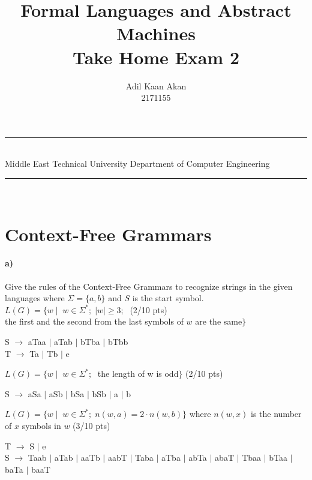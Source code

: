 \documentclass[a4paper,12pt]{article}
\title{Formal Languages and Abstract Machines \\ Take Home Exam 2}
\author{Adil Kaan Akan \\ 2171155} %
\date{} %
\newcommand{\HRule}{\rule{\linewidth}{1mm}}
\begin{document}
\HRule\\
Middle East Technical University \hfill Department of Computer Engineering
{\let\newpage\relax\maketitle}
\HRule\\
\vspace{1cm}


\section{Context-Free Grammars \hfill {}}

\paragraph{a)} Give the rules of the Context-Free Grammars to recognize strings in the given languages where $\Sigma=\{a,b\}$ and $S$ is the start symbol. \\  

$L(G)=\{w \mid \;  w \in \Sigma^*;\; |w| \geq 3;\; $  \hfill \small{(2/10 pts)} \\
\hspace*{22mm} the first and the second from the last symbols of $w$ are the same$\}$ \\

\begin{tcolorbox}
S $\rightarrow$ aTaa $|$ aTab $|$ bTba $|$ bTbb \\
T $\rightarrow$ Ta $|$ Tb $|$ e
\end{tcolorbox}


$L(G)=\{w \mid \;  w \in \Sigma^*;\; $ the length of w is odd$\}$ \hfill \small{(2/10 pts)} \\

\begin{tcolorbox}
S $\rightarrow$ aSa $|$ aSb $|$ bSa $|$ bSb $|$ a $|$ b
\end{tcolorbox}


$L(G)=\{w \mid \;  w \in \Sigma^*;\; n(w,a)=2\cdot n(w,b)\}$ where $n(w,x)$ is the number of $x$ symbols in $w$ \hfill \small{(3/10 pts)} \\

\begin{tcolorbox}
T $\rightarrow$ S $|$ e \\
S $\rightarrow$ Taab $|$ aTab $|$ aaTb $|$ aabT $|$ Taba $|$ aTba $|$ abTa $|$ abaT $|$ Tbaa $|$ bTaa $|$ baTa $|$ baaT
\end{tcolorbox}
\end{document}
